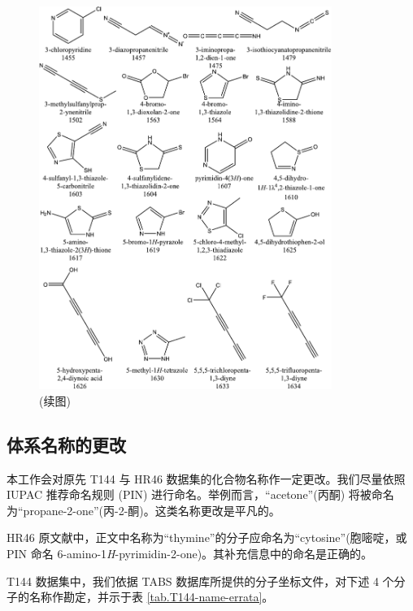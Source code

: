 \begin{figure}[H]
    \centering
    \includegraphics[width=0.85\textwidth]{assets/fig-s2-5.pdf}
    \caption{(续图)}
    \label{fig.fig-s2-5}
\end{figure}

\newpage

\subsection{体系名称的更改}
\label{sec.T145-HR46-name-change}

本工作会对原先 T144 与 HR46 数据集的化合物名称作一定更改。我们尽量依照 IUPAC 推荐命名规则 (PIN) 进行命名\cite{Favre-Powell.RSC.2013}。举例而言，“acetone”(丙酮) 将被命名为“propane-2-one”(丙-2-酮)。这类名称更改是平凡的。

HR46 原文献\cite{Hickey-Rowley.JPCA.2014}中，正文中名称为“thymine”的分子应命名为“cytosine”(胞嘧啶，或 PIN 命名 6-amino-1\textit{H}-pyrimidin-2-one)。其补充信息中的命名是正确的。

T144 数据集中，我们依据 TABS 数据库所提供的分子坐标文件，对下述 4 个分子的名称作勘定，并示于表 \ref{tab.T144-name-errata}。

